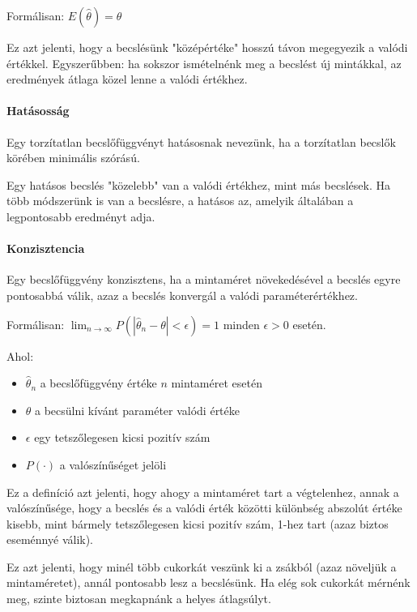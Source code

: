 \documentclass[a4paper,12pt]{article}
\begin{document}
    Formálisan: $E(\hat{\theta}) = \theta$

    Ez azt jelenti, hogy a becslésünk "középértéke" hosszú távon megegyezik a valódi értékkel. Egyszerűbben: ha sokszor ismételnénk meg a becslést új mintákkal, az eredmények átlaga közel lenne a valódi értékhez.

    \paragraph{Hatásosság}

    Egy torzítatlan becslőfüggvényt hatásosnak nevezünk, ha a torzítatlan becslők körében minimális szórású.

    Egy hatásos becslés "közelebb" van a valódi értékhez, mint más becslések. Ha több módszerünk is van a becslésre, a hatásos az, amelyik általában a legpontosabb eredményt adja.

    \paragraph{Konzisztencia}
    Egy becslőfüggvény konzisztens, ha a mintaméret növekedésével a becslés egyre pontosabbá válik, azaz a becslés konvergál a valódi paraméterértékhez.

    Formálisan: $\lim_{n\to\infty} P\left(|\hat{\theta}_n - \theta| < \epsilon\right) = 1$ minden $\epsilon > 0$ esetén.

    Ahol:
    \begin{itemize}
        \item $\hat{\theta}_n$ a becslőfüggvény értéke $n$ mintaméret esetén
        \item $\theta$ a becsülni kívánt paraméter valódi értéke
        \item $\epsilon$ egy tetszőlegesen kicsi pozitív szám
        \item $P(\cdot)$ a valószínűséget jelöli
    \end{itemize}

    Ez a definíció azt jelenti, hogy ahogy a mintaméret tart a végtelenhez, annak a valószínűsége, hogy a becslés és a valódi érték közötti különbség abszolút értéke kisebb, mint bármely tetszőlegesen kicsi pozitív szám, 1-hez tart (azaz biztos eseménnyé válik).

    Ez azt jelenti, hogy minél több cukorkát veszünk ki a zsákból (azaz növeljük a mintaméretet), annál pontosabb lesz a becslésünk. Ha elég sok cukorkát mérnénk meg, szinte biztosan megkapnánk a helyes átlagsúlyt.
\end{document}
